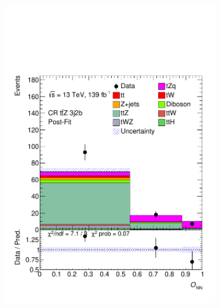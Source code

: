 \begin{figure}[!h]
\begin{subfigure}[b]{0.33\linewidth}
    \includegraphics[width=\textwidth]{ubonn-thesis/Chapters/Chapters_07/Figure/Data/CR_3j2b_postFit.pdf} 
  \end{subfigure} 
  \newline
  \begin{subfigure}[b]{0.33\linewidth}
    \centering

\end{subfigure}
\end{figure}

